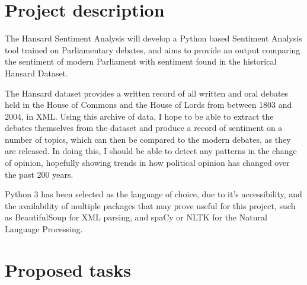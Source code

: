 \documentclass[11pt,fleqn,twoside]{article}
\begin{document}
\wordcount{}

\mmp

\setcounter{tocdepth}{3} %


\section{Project description}
The Hansard  Sentiment Analysis will develop a Python based Sentiment Analysis tool trained on Parliamentary debates, and aims to provide an output comparing the sentiment of modern Parliament with sentiment found in the historical Hansard Dataset. 
\par
The Hansard dataset provides a written record of all written and oral debates held in the House of Commons and the House of Lords from between 1803 and 2004, in XML. Using this archive of data, I hope to be able to extract the debates themselves from the dataset and produce a record of sentiment on a number of topics, which can then be compared to the modern debates, as they are released. In doing this, I should be able to detect any patterns in the change of opinion, hopefully showing trends in how political opinion has changed over the past 200 years. 
\par
Python 3 has been selected as the language of choice, due to it's accessibility, and the availability of multiple packages that may prove useful for this project, such as BeautifulSoup for XML parsing, and spaCy or NLTK for the Natural Language Processing.


\section{Proposed tasks}
\end{document}
